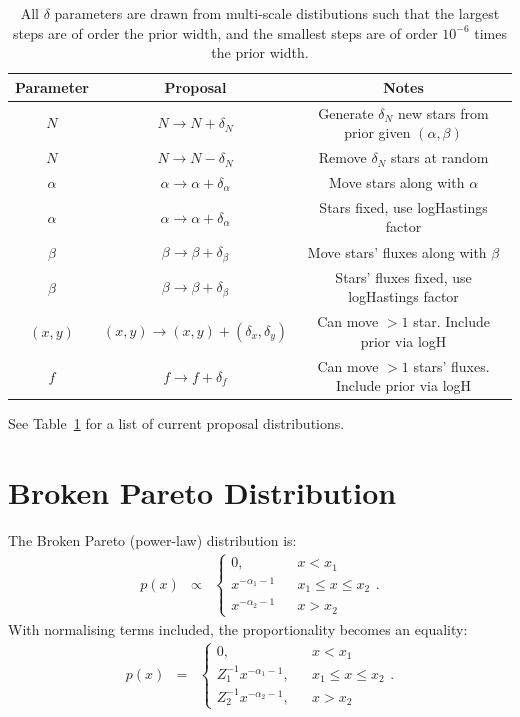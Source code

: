 \documentclass[letterpaper, 11pt]{article}
\begin{document}
\begin{table}
\begin{center}
\begin{tabular}{c|c|c}
Parameter & Proposal & Notes\\
\hline
$N$ & $N \to N + \delta_N$ & Generate $\delta_N$ new stars from prior given
$(\alpha, \beta)$\\
$N$ & $N \to N - \delta_N$ & Remove $\delta_N$ stars at random\\
$\alpha$ & $\alpha \to \alpha + \delta_\alpha$ & Move stars along with $\alpha$
\\
$\alpha$ & $\alpha \to \alpha + \delta_\alpha$ & Stars fixed, use logHastings
factor \\
$\beta$ & $\beta \to \beta + \delta_\beta$ & Move stars' fluxes along with
$\beta$\\
$\beta$ & $\beta \to \beta + \delta_\beta$ & Stars' fluxes fixed, use
logHastings factor \\
$(x,y)$ & $(x,y) \to (x,y)+(\delta_x, \delta_y)$ & Can move $>1$ star.
Include prior via logH \\
$f$ & $f \to f + \delta_f$ & Can move $>1$ stars' fluxes. Include prior
via logH
\end{tabular}
\end{center}
\caption{All $\delta$ parameters are drawn from multi-scale distibutions such
that the largest steps are of order the prior width, and the smallest steps
are of order $10^{-6}$ times the prior width.\label{proposals}}
\end{table}

See Table~\ref{proposals} for a list of current proposal distributions.

\section{Broken Pareto Distribution}

The Broken Pareto (power-law) distribution is:
\begin{eqnarray}
p(x) &\propto&
\left\{
\begin{array}{lcr}
0, & & x < x_1 \\
x^{-\alpha_1 - 1} & & x_1 \leq x \leq x_2 \\
x^{-\alpha_2 - 1} & & x > x_2
\end{array}
\right.
.
\end{eqnarray}
With normalising terms included, the proportionality becomes an equality:
\begin{eqnarray}
p(x) &=&
\left\{
\begin{array}{lcr}
0, & & x < x_1 \\
Z_1^{-1}x^{-\alpha_1 - 1}, & & x_1 \leq x \leq x_2 \\
Z_2^{-1}x^{-\alpha_2 - 1}, & & x > x_2
\end{array}
\right.
.
\end{eqnarray}
\end{document}
